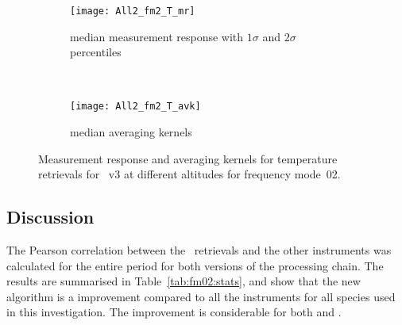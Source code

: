 \begin{figure}[tbhp]
    \centering
    \begin{subfigure}[b]{0.49\textwidth}
        \texttt{[image: All2\_fm2\_T\_mr]}
        \caption{median measurement response with $1\sigma$ and $2\sigma$
        percentiles}
        \label{fig:fm02:T:mr}
    \end{subfigure}
    \,
    \begin{subfigure}[b]{0.49\textwidth}
        \texttt{[image: All2\_fm2\_T\_avk]}
        \caption{median averaging kernels\newline~}
        \label{fig:fm02:T:avk}
    \end{subfigure}
    \caption{Measurement response and averaging kernels for temperature
    retrievals for \smr~v3 at different altitudes for frequency mode~02.}
    \label{fig:fm02:T:mr_avk}
\end{figure}


\subsection{Discussion}
\label{sec:fm02:discussion}
The Pearson correlation between the \smr\ retrievals and the other instruments
was calculated for the entire period for both versions of the processing chain.
The results are summarised in Table~\ref{tab:fm02:stats}, and show that the
new algorithm is a improvement compared to all the instruments for all species
used in this investigation. The improvement is considerable for both 
and .


